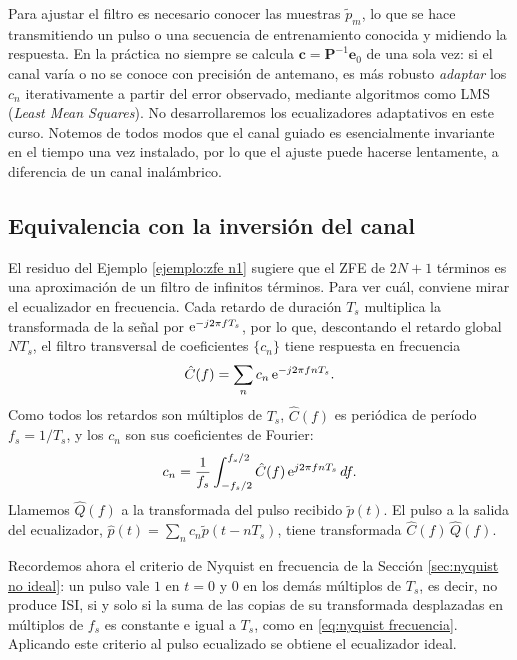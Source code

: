 Para ajustar el filtro es necesario conocer las muestras $\tilde p_m$, lo que se hace transmitiendo un pulso o una secuencia de entrenamiento conocida y midiendo la respuesta. En la práctica no siempre se calcula $\mathbf c=\mathbf P^{-1}\mathbf e_0$ de una sola vez: si el canal varía o no se conoce con precisión de antemano, es más robusto \emph{adaptar} los $c_n$ iterativamente a partir del error observado, mediante algoritmos como LMS (\emph{Least Mean Squares}). No desarrollaremos los ecualizadores adaptativos en este curso. Notemos de todos modos que el canal guiado es esencialmente invariante en el tiempo una vez instalado, por lo que el ajuste puede hacerse lentamente, a diferencia de un canal inalámbrico.

\subsection*{Equivalencia con la inversión del canal}

El residuo del Ejemplo \ref{ejemplo:zfe n1} sugiere que el ZFE de $2N+1$ términos es una aproximación de un filtro de infinitos términos. Para ver cuál, conviene mirar el ecualizador en frecuencia. Cada retardo de duración $T_s$ multiplica la transformada de la señal por $\mathrm{e}^{-j2\pi fT_s}$, por lo que, descontando el retardo global $NT_s$, el filtro transversal de coeficientes $\{c_n\}$ tiene respuesta en frecuencia
\begin{equation}\label{eq:respuesta ecualizador}
    \hat C(f) = \sum_{n} c_n\, \mathrm{e}^{-j2\pi f nT_s}.
\end{equation}
Como todos los retardos son múltiplos de $T_s$, $\hat C(f)$ es periódica de período $f_s=1/T_s$, y los $c_n$ son sus coeficientes de Fourier:
\begin{equation*}
    c_n = \frac{1}{f_s}\int_{-f_s/2}^{f_s/2} \hat C(f)\,\mathrm{e}^{j2\pi f nT_s}\, df.
\end{equation*}
Llamemos $\hat Q(f)$ a la transformada del pulso recibido $\tilde p(t)$. El pulso a la salida del ecualizador, $\hat p(t)=\sum_n c_n\tilde p(t-nT_s)$, tiene transformada $\hat C(f)\,\hat Q(f)$.

Recordemos ahora el criterio de Nyquist en frecuencia de la Sección \ref{sec:nyquist no ideal}: un pulso vale $1$ en $t=0$ y $0$ en los demás múltiplos de $T_s$, es decir, no produce ISI, si y solo si la suma de las copias de su transformada desplazadas en múltiplos de $f_s$ es constante e igual a $T_s$, como en \eqref{eq:nyquist frecuencia}. Aplicando este criterio al pulso ecualizado se obtiene el ecualizador ideal.

